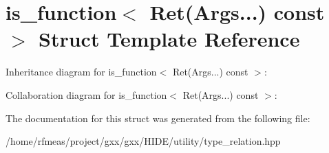 \hypertarget{structis__function_3_01Ret_07Args_8_8_8_08_01const_01_01_4}{}\section{is\+\_\+function$<$ Ret(Args...) const $>$ Struct Template Reference}
\label{structis__function_3_01Ret_07Args_8_8_8_08_01const_01_01_4}


Inheritance diagram for is\+\_\+function$<$ Ret(Args...) const $>$\+:


Collaboration diagram for is\+\_\+function$<$ Ret(Args...) const $>$\+:


The documentation for this struct was generated from the following file\+:\begin{DoxyCompactItemize}
\item 
/home/rfmeas/project/gxx/gxx/\+H\+I\+D\+E/utility/type\+\_\+relation.\+hpp\end{DoxyCompactItemize}
